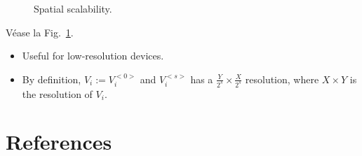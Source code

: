 \begin{figure}
  \caption{Spatial scalability.}
  \label{fig:spatial-scalability}
\end{figure}

Véase la Fig.~\ref{fig:spatial-scalability}.

\begin{itemize}
\item
  Useful for low-resolution devices.
\item
  By definition, $V_i:=V_i^{<0>}$ and $V_i^{<s>}$ has a
  $\frac{Y}{2^s}\times \frac{X}{2^s}$ resolution, where $X\times Y$
  is the resolution of $V_i$.
\end{itemize}

\section{References}

\renewcommand{\addcontentsline}[3]{}%

